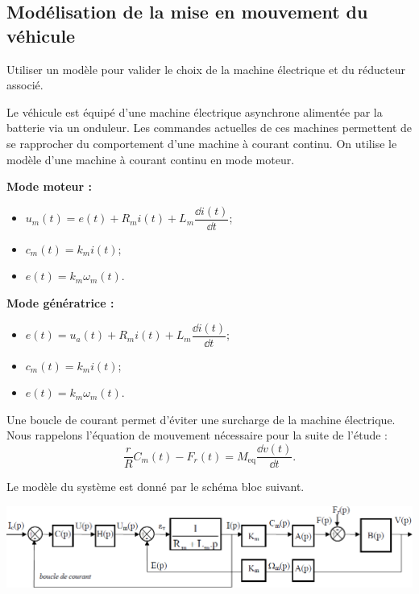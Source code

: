 \documentclass[10pt,fleqn]{article} %
\begin{document}
\subsection*{Modélisation de la mise en mouvement du véhicule}
\begin{obj}
Utiliser un modèle pour valider le choix de la machine électrique et du réducteur associé.
\end{obj}


Le véhicule est équipé d’une machine électrique asynchrone alimentée par la batterie via un onduleur. Les
commandes actuelles de ces machines permettent de se rapprocher du comportement d’une machine à courant
continu.
On utilise le modèle d’une machine à courant continu en mode moteur. 

\textbf{Mode moteur :}
\begin{itemize}
\item $u_m(t)=e(t)+R_m i(t)+L_m \dfrac{\dd i(t)}{\dd t}$;
\item $c_m(t)=k_m i(t)$;
\item $e(t)=k_m\omega_m(t)$.
\end{itemize}
\textbf{Mode génératrice :}
\begin{itemize}
\item $e(t)=u_a(t)+R_m i(t)+L_m \dfrac{\dd i(t)}{\dd t}$;
\item $c_m(t)=k_m i(t)$;
\item $e(t)=k_m\omega_m(t)$.
\end{itemize}

Une boucle de courant permet d’éviter une surcharge de la machine électrique.
Nous rappelons l’équation de mouvement nécessaire pour la suite de l’étude : 
$$\dfrac{r}{R}C_m(t)-F_r(t)=M_{\text{eq}}\dfrac{\dd v(t)}{\dd t}.$$

Le modèle du système est donné par le schéma bloc suivant.

\begin{center}
\includegraphics[width=\linewidth]{images/ccmp_01}
\end{center}
\end{document}

